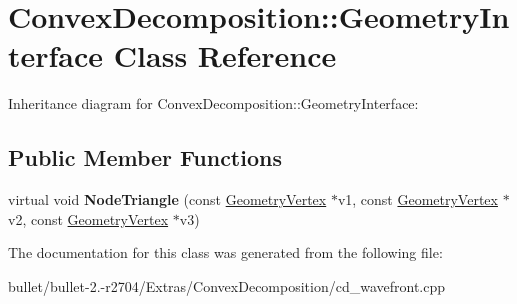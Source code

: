 \hypertarget{class_convex_decomposition_1_1_geometry_interface}{\section{Convex\+Decomposition\+:\+:Geometry\+Interface Class Reference}
\label{class_convex_decomposition_1_1_geometry_interface}
}


Inheritance diagram for Convex\+Decomposition\+:\+:Geometry\+Interface\+:
\subsection*{Public Member Functions}
\begin{DoxyCompactItemize}
\item 
\hypertarget{class_convex_decomposition_1_1_geometry_interface_a5e486be449fa826a4b5a38d8c76f317f}{virtual void {\bfseries Node\+Triangle} (const \hyperlink{class_convex_decomposition_1_1_geometry_vertex}{Geometry\+Vertex} $\ast$v1, const \hyperlink{class_convex_decomposition_1_1_geometry_vertex}{Geometry\+Vertex} $\ast$v2, const \hyperlink{class_convex_decomposition_1_1_geometry_vertex}{Geometry\+Vertex} $\ast$v3)}\label{class_convex_decomposition_1_1_geometry_interface_a5e486be449fa826a4b5a38d8c76f317f}

\end{DoxyCompactItemize}


The documentation for this class was generated from the following file\+:\begin{DoxyCompactItemize}
\item 
bullet/bullet-\/2.-\/r2704/\+Extras/\+Convex\+Decomposition/cd\+\_\+wavefront.\+cpp\end{DoxyCompactItemize}
